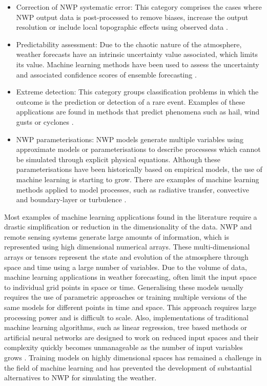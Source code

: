 \begin{itemize}
  \item Correction of NWP systematic error: This category comprises the cases where NWP output data is post-processed to remove biases, increase the output resolution or include local topographic effects using observed data \citep{aznarte2017dynamic,buehner2010intercomparison}.
  \item Predictability assessment: Due to the chaotic nature of the atmosphere, weather forecasts have an intrinsic uncertainty value associated, which limits its value. Machine learning methods have been used to assess the uncertainty and associated confidence scores of ensemble forecasting \citep{wilks2002smoothing,foley2012current,mallet2009ozone}.
  \item Extreme detection: This category groups classification problems in which the outcome is the prediction or detection of a rare event. Examples of these applications are found in methods that predict phenomena such as hail, wind gusts or cyclones \citep{mcgovern2017using,williams2008remote,herman2018money}.
  \item NWP parameterisations: NWP models generate multiple variables using approximate models or parameterisations to describe processess which cannot be simulated through explicit physical equations. Although these parameterisations have been historically based on empirical models, the use of machine learning is starting to grow. There are examples of machine learning methods applied to model processes, such as radiative transfer, convective and boundary-layer or turbulence \citep{szturc2007parameterisation,o2018using,gentine2018could}.
\end{itemize}

\medskip

Most examples of machine learning applications found in the literature require a drastic simplification or reduction in the dimensionality of the data. NWP and remote sensing systems generate large amounts of information, which is represented using high dimensional numerical arrays. These multi-dimensional arrays or tensors represent the state and evolution of the atmosphere through space and time using a large number of variables. Due to the volume of data, machine learning applications in weather forecasting, often limit the input space to individual grid points in space or time. Generalising these models usually requires the use of parametric approaches or training multiple versions of the same models for different points in time and space. This approach requires large processing power and is difficult to scale. Also, implementations of traditional machine learning algorithms, such as linear regression, tree based methods or artificial neural networks are designed to work on reduced input spaces and their complexity quickly becomes unmanageable as the number of input variables grows \citep{raible1999statistical,bowler2006steps}. Training models on highly dimensional spaces has remained a challenge in the field of machine learning \citep{fan2013mining} and has prevented the development of substantial alternatives to NWP for simulating the weather. 

